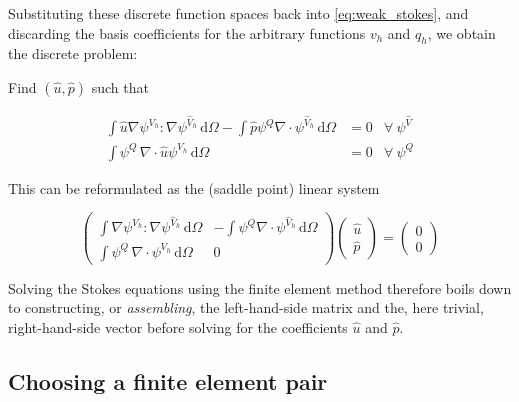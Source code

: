 \documentclass[thesis]{subfiles}
\begin{document}
Substituting these discrete function spaces back into \cref{eq:weak_stokes}, and discarding the basis coefficients for the arbitrary functions $v_h$ and $q_h$, we obtain the discrete problem:

\vspace{1em}

Find $(\hat u, \hat p)$ such that

\begin{subequations}
  \begin{align}
    \int \hat u \nabla \psi^{V_h} : \nabla \psi^{\hat V_h} \, \textrm{d}\Omega
    - \int \hat p \psi^Q \nabla \cdot \psi^{\hat V_h} \, \textrm{d}\Omega
    &= 0
    &\forall \ \psi^{\hat V} \\
    \int \psi^Q \, \nabla \cdot \hat u \psi^{V_h} \, \textrm{d}\Omega
    &= 0
    &\forall \ \psi^{Q}
  \end{align}
  \label{eq:weak_stokes_discrete}
\end{subequations}

This can be reformulated as the (saddle point) linear system

\begin{equation}
  \left (
  \begin{array}{c|c}
    \int \nabla \psi^{V_h} : \nabla \psi^{\hat V_h} \, \textrm{d}\Omega
    &
    - \int \psi^Q \nabla \cdot \psi^{\hat V_h} \, \textrm{d}\Omega \\
    \hline
    \int \psi^Q \, \nabla \cdot \psi^{V_h} \, \textrm{d}\Omega
    &
    0
  \end{array}
  \right )
  \left (
  \begin{array}{c}
    \hat u \\
    \hline
    \hat p
  \end{array}
  \right )
  =
  \left (
  \begin{array}{c}
    0 \\ \hline 0
  \end{array}
  \right )
  \label{eq:stokes_linear_system}
\end{equation}

Solving the Stokes equations using the finite element method therefore boils down to constructing, or \textit{assembling}, the left-hand-side matrix and the, here trivial, right-hand-side vector before solving for the coefficients $\hat u$ and $\hat p$.

\subsection{Choosing a finite element pair}
\end{document}
